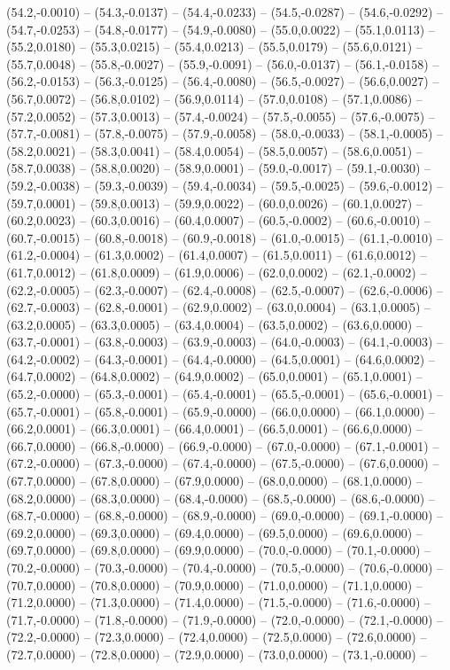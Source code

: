 \documentclass{SVnote}
\begin{document}
(54.2,-0.0010) -- (54.3,-0.0137) -- (54.4,-0.0233) -- (54.5,-0.0287) -- (54.6,-0.0292) -- (54.7,-0.0253) -- (54.8,-0.0177) -- (54.9,-0.0080) -- (55.0,0.0022) -- (55.1,0.0113) -- (55.2,0.0180) -- (55.3,0.0215) -- (55.4,0.0213) -- (55.5,0.0179) -- (55.6,0.0121) -- (55.7,0.0048) -- (55.8,-0.0027) -- (55.9,-0.0091) -- (56.0,-0.0137) -- (56.1,-0.0158) -- (56.2,-0.0153) -- (56.3,-0.0125) -- (56.4,-0.0080) -- (56.5,-0.0027) -- (56.6,0.0027) -- (56.7,0.0072) -- (56.8,0.0102) -- (56.9,0.0114) -- (57.0,0.0108) -- (57.1,0.0086) -- (57.2,0.0052) -- (57.3,0.0013) -- (57.4,-0.0024) -- (57.5,-0.0055) -- (57.6,-0.0075) -- (57.7,-0.0081) -- (57.8,-0.0075) -- (57.9,-0.0058) -- (58.0,-0.0033) -- (58.1,-0.0005) -- (58.2,0.0021) -- (58.3,0.0041) -- (58.4,0.0054) -- (58.5,0.0057) -- (58.6,0.0051) -- (58.7,0.0038) -- (58.8,0.0020) -- (58.9,0.0001) -- (59.0,-0.0017) -- (59.1,-0.0030) -- (59.2,-0.0038) -- (59.3,-0.0039) -- (59.4,-0.0034) -- (59.5,-0.0025) -- (59.6,-0.0012) -- (59.7,0.0001) -- (59.8,0.0013) -- (59.9,0.0022) -- (60.0,0.0026) -- (60.1,0.0027) -- (60.2,0.0023) -- (60.3,0.0016) -- (60.4,0.0007) -- (60.5,-0.0002) -- (60.6,-0.0010) -- (60.7,-0.0015) -- (60.8,-0.0018) -- (60.9,-0.0018) -- (61.0,-0.0015) -- (61.1,-0.0010) -- (61.2,-0.0004) -- (61.3,0.0002) -- (61.4,0.0007) -- (61.5,0.0011) -- (61.6,0.0012) -- (61.7,0.0012) -- (61.8,0.0009) -- (61.9,0.0006) -- (62.0,0.0002) -- (62.1,-0.0002) -- (62.2,-0.0005) -- (62.3,-0.0007) -- (62.4,-0.0008) -- (62.5,-0.0007) -- (62.6,-0.0006) -- (62.7,-0.0003) -- (62.8,-0.0001) -- (62.9,0.0002) -- (63.0,0.0004) -- (63.1,0.0005) -- (63.2,0.0005) -- (63.3,0.0005) -- (63.4,0.0004) -- (63.5,0.0002) -- (63.6,0.0000) -- (63.7,-0.0001) -- (63.8,-0.0003) -- (63.9,-0.0003) -- (64.0,-0.0003) -- (64.1,-0.0003) -- (64.2,-0.0002) -- (64.3,-0.0001) -- (64.4,-0.0000) -- (64.5,0.0001) -- (64.6,0.0002) -- (64.7,0.0002) -- (64.8,0.0002) -- (64.9,0.0002) -- (65.0,0.0001) -- (65.1,0.0001) -- (65.2,-0.0000) -- (65.3,-0.0001) -- (65.4,-0.0001) -- (65.5,-0.0001) -- (65.6,-0.0001) -- (65.7,-0.0001) -- (65.8,-0.0001) -- (65.9,-0.0000) -- (66.0,0.0000) -- (66.1,0.0000) -- (66.2,0.0001) -- (66.3,0.0001) -- (66.4,0.0001) -- (66.5,0.0001) -- (66.6,0.0000) -- (66.7,0.0000) -- (66.8,-0.0000) -- (66.9,-0.0000) -- (67.0,-0.0000) -- (67.1,-0.0001) -- (67.2,-0.0000) -- (67.3,-0.0000) -- (67.4,-0.0000) -- (67.5,-0.0000) -- (67.6,0.0000) -- (67.7,0.0000) -- (67.8,0.0000) -- (67.9,0.0000) -- (68.0,0.0000) -- (68.1,0.0000) -- (68.2,0.0000) -- (68.3,0.0000) -- (68.4,-0.0000) -- (68.5,-0.0000) -- (68.6,-0.0000) -- (68.7,-0.0000) -- (68.8,-0.0000) -- (68.9,-0.0000) -- (69.0,-0.0000) -- (69.1,-0.0000) -- (69.2,0.0000) -- (69.3,0.0000) -- (69.4,0.0000) -- (69.5,0.0000) -- (69.6,0.0000) -- (69.7,0.0000) -- (69.8,0.0000) -- (69.9,0.0000) -- (70.0,-0.0000) -- (70.1,-0.0000) -- (70.2,-0.0000) -- (70.3,-0.0000) -- (70.4,-0.0000) -- (70.5,-0.0000) -- (70.6,-0.0000) -- (70.7,0.0000) -- (70.8,0.0000) -- (70.9,0.0000) -- (71.0,0.0000) -- (71.1,0.0000) -- (71.2,0.0000) -- (71.3,0.0000) -- (71.4,0.0000) -- (71.5,-0.0000) -- (71.6,-0.0000) -- (71.7,-0.0000) -- (71.8,-0.0000) -- (71.9,-0.0000) -- (72.0,-0.0000) -- (72.1,-0.0000) -- (72.2,-0.0000) -- (72.3,0.0000) -- (72.4,0.0000) -- (72.5,0.0000) -- (72.6,0.0000) -- (72.7,0.0000) -- (72.8,0.0000) -- (72.9,0.0000) -- (73.0,0.0000) -- (73.1,-0.0000) -- 
\end{document}
